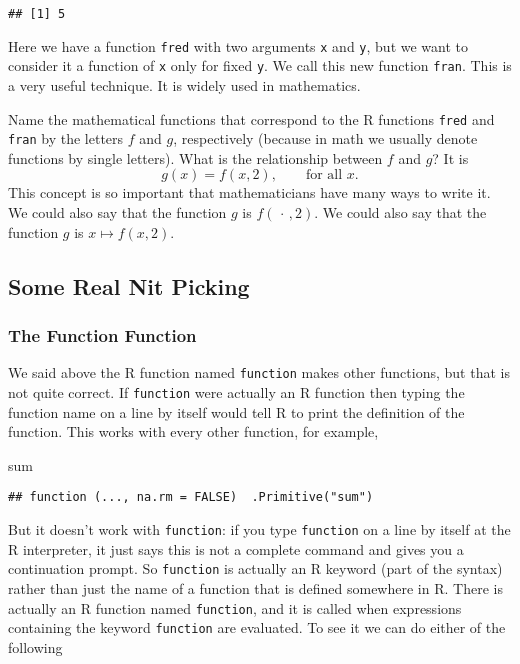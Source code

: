 \documentclass[
]{article}
\newenvironment{Shaded}{\begin{snugshade}}{\end{snugshade}}
\newcommand{\NormalTok}[1]{#1}
\begin{document}
\begin{verbatim}
## [1] 5
\end{verbatim}

Here we have a function \texttt{fred} with two arguments \texttt{x} and
\texttt{y}, but we want to consider it a function of \texttt{x} only for
fixed \texttt{y}. We call this new function \texttt{fran}. This is a
very useful technique. It is widely used in mathematics.

Name the mathematical functions that correspond to the R functions
\texttt{fred} and \texttt{fran} by the letters \(f\) and \(g\),
respectively (because in math we usually denote functions by single
letters). What is the relationship between \(f\) and \(g\)? It is \[
   g(x) = f(x, 2), \qquad \text{for all $x$}.
\] This concept is so important that mathematicians have many ways to
write it. We could also say that the function \(g\) is
\(f(\,\cdot\,, 2)\). We could also say that the function \(g\) is
\(x \mapsto f(x, 2)\).

\hypertarget{some-real-nit-picking}{%
\subsection{Some Real Nit Picking}\label{some-real-nit-picking}}

\hypertarget{the-function-function}{%
\subsubsection{The Function Function}\label{the-function-function}}

We said above the R function named \texttt{function} makes other
functions, but that is not quite correct. If \texttt{function} were
actually an R function then typing the function name on a line by itself
would tell R to print the definition of the function. This works with
every other function, for example,

\begin{Shaded}
\begin{Highlighting}[]
\NormalTok{sum}
\end{Highlighting}
\end{Shaded}

\begin{verbatim}
## function (..., na.rm = FALSE)  .Primitive("sum")
\end{verbatim}

But it doesn't work with \texttt{function}: if you type
\texttt{function} on a line by itself at the R interpreter, it just says
this is not a complete command and gives you a continuation prompt. So
\texttt{function} is actually an R keyword (part of the syntax) rather
than just the name of a function that is defined somewhere in R. There
is actually an R function named \texttt{function}, and it is called when
expressions containing the keyword \texttt{function} are evaluated. To
see it we can do either of the following
\end{document}
